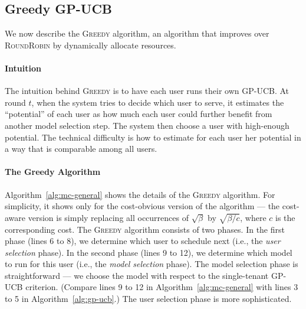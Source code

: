 \documentclass[letterpaper]{vldb}
\newcommand{\rr}{\textsc{RoundRobin}\xspace}
\newcommand{\greedy}{\textsc{Greedy}\xspace}
\begin{document}
\subsection{Greedy GP-UCB}

We now describe the \greedy algorithm, an 
algorithm that improves over \rr by 
dynamically allocate resources.

\vspace{-0.5em}
\paragraph*{Intuition}
The intuition behind \greedy is to have
each user runs their own GP-UCB. At round
$t$, when the system tries to decide which
user to serve, it estimates the
``potential'' of each user as how much each
user could further benefit from another
model selection step. The system then
choose a user with high-enough potential.
The technical difficulty is how to
estimate for each user her potential
in a way that is comparable among all users.

\vspace{-0.5em}
\paragraph*{The Greedy Algorithm}

Algorithm~\ref{alg:mc-general} shows the details 
of the \greedy algorithm. For simplicity,
it shows only for the cost-obvious version of the algorithm --- the cost-aware version is simply replacing all occurrences of $\sqrt{\beta}$ by $\sqrt{\beta/c}$, where $c$ is the corresponding cost.
The \greedy algorithm consists of two phases.
In the first phase (lines 6 to 8), we determine which user to schedule next (i.e., the \emph{user selection} phase).
In the second phase (lines 9 to 12), we determine which model to run for this user (i.e., the \emph{model selection} phase).
The model selection phase is straightforward --- we choose the model with respect to the single-tenant GP-UCB criterion. (Compare lines 9 to 12 in Algorithm~\ref{alg:mc-general} with lines 3 to 5 in Algorithm~\ref{alg:gp-ucb}.)
The user selection phase is more sophisticated.
\end{document}
